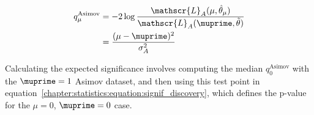 \begin{equation}
\begin{aligned}
q_{\mu}^{\textrm{Asimov}} &=
 -2\log{\frac{\mathscr{L}_A(\mu,\hat{\theta}_{\mu})}{\mathscr{L}_A(\muprime,\tilde{\theta})}}\\
 &= \frac{(\mu-\muprime)^2}{\sigma_A^2}
\end{aligned}
\end{equation}

\noindent
Calculating the expected significance involves computing the median
$q_{0}^{\textrm{Asimov}}$ with the $\muprime = 1$ Asimov dataset, and then using this
test point in
equation~\ref{chapter:statistics:equation:signif_discovery}, which
defines the p-value for the $\mu = 0$, $\muprime = 0$ case. 


